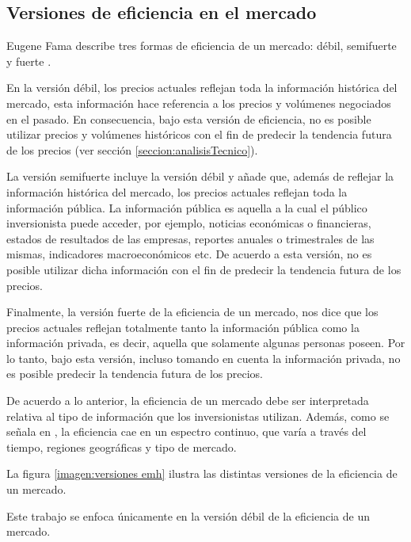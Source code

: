 \documentclass[12pt]{report}
\theoremstyle{break}
\theoremstyle{break}
\begin{document}
\subsection{Versiones de eficiencia en el mercado}
\label{subseccion:versiones emh}
Eugene Fama describe tres formas de eficiencia de un mercado: débil, semifuerte y fuerte \cite{Fama1965}.

En la versión débil, los precios actuales reflejan toda la información histórica del mercado, esta información hace referencia a los precios y volúmenes negociados en el pasado. En consecuencia, bajo esta versión de eficiencia, no es posible utilizar precios y volúmenes históricos con el fin de predecir la tendencia futura de los precios (ver sección \ref{seccion:analisisTecnico}).

La versión semifuerte incluye la versión débil y añade que, además de reflejar la información histórica del mercado, los precios actuales reflejan toda la información pública. La información pública es aquella a la cual el público inversionista puede acceder, por ejemplo, noticias económicas o financieras, estados de resultados de las empresas, reportes anuales o trimestrales de las mismas, indicadores macroeconómicos etc. De acuerdo a esta versión, no es posible utilizar dicha información con el fin de predecir la tendencia futura de los precios.

Finalmente, la versión fuerte de la eficiencia de un mercado, nos dice que los precios actuales reflejan totalmente tanto la información pública como la información privada, es decir, aquella que solamente algunas personas poseen. Por lo tanto, bajo esta versión, incluso tomando en cuenta la información privada, no es posible predecir la tendencia futura de los precios.

De acuerdo a lo anterior, la eficiencia de un mercado debe ser interpretada relativa al tipo de información que los inversionistas utilizan. Además, como se señala en \cite{CFA2019}, la eficiencia cae en un espectro continuo, que varía a través del tiempo, regiones geográficas y tipo de mercado.

La figura \ref{imagen:versiones emh} ilustra las distintas versiones de la eficiencia de un mercado.

Este trabajo se enfoca únicamente en la versión débil de la eficiencia de un mercado.
\end{document}
